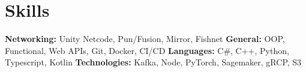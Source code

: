 \section{Skills}
\begin{twocolentryb}{
    \textbf{Networking:} Unity Netcode, Pun/Fusion, Mirror, Fishnet
    \textbf{General:} OOP, Functional, Web APIs, Git, Docker, CI/CD 
}
    \textbf{Languages:} C\#, C++, Python, Typescript, Kotlin
    \textbf{Technologies:} Kafka, Node, PyTorch, Sagemaker, gRCP, S3
\end{twocolentryb}